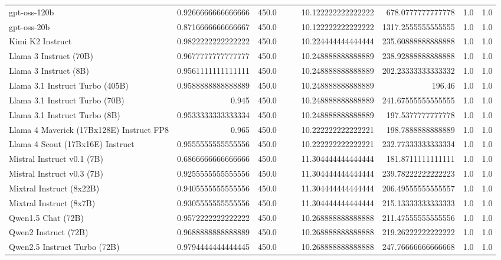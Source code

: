 \begin{table}[htp]
{\begin{tabular}{lrrrrrrrr}
gpt-oss-120b & 0.9266666666666666 & 450.0 &  &  & 10.122222222222222 & 678.0777777777778 & 1.0 & 1.0 \\
gpt-oss-20b & 0.8716666666666667 & 450.0 &  &  & 10.122222222222222 & 1317.2555555555555 & 1.0 & 1.0 \\
Kimi K2 Instruct & 0.9822222222222222 & 450.0 &  &  & 10.224444444444444 & 235.60888888888888 & 1.0 & 1.0 \\
Llama 3 Instruct (70B) & 0.9677777777777777 & 450.0 &  &  & 10.248888888888889 & 238.92888888888888 & 1.0 & 1.0 \\
Llama 3 Instruct (8B) & 0.9561111111111111 & 450.0 &  &  & 10.248888888888889 & 202.23333333333332 & 1.0 & 1.0 \\
Llama 3.1 Instruct Turbo (405B) & 0.9588888888888889 & 450.0 &  &  & 10.248888888888889 & 196.46 & 1.0 & 1.0 \\
Llama 3.1 Instruct Turbo (70B) & 0.945 & 450.0 &  &  & 10.248888888888889 & 241.67555555555555 & 1.0 & 1.0 \\
Llama 3.1 Instruct Turbo (8B) & 0.9533333333333334 & 450.0 &  &  & 10.248888888888889 & 197.5377777777778 & 1.0 & 1.0 \\
Llama 4 Maverick (17Bx128E) Instruct FP8 & 0.965 & 450.0 &  &  & 10.222222222222221 & 198.7888888888889 & 1.0 & 1.0 \\
Llama 4 Scout (17Bx16E) Instruct & 0.9555555555555556 & 450.0 &  &  & 10.222222222222221 & 232.77333333333334 & 1.0 & 1.0 \\
Mistral Instruct v0.1 (7B) & 0.6866666666666666 & 450.0 &  &  & 11.304444444444444 & 181.8711111111111 & 1.0 & 1.0 \\
Mistral Instruct v0.3 (7B) & 0.9255555555555556 & 450.0 &  &  & 11.304444444444444 & 239.78222222222223 & 1.0 & 1.0 \\
Mixtral Instruct (8x22B) & 0.9405555555555556 & 450.0 &  &  & 11.304444444444444 & 206.49555555555557 & 1.0 & 1.0 \\
Mixtral Instruct (8x7B) & 0.9305555555555556 & 450.0 &  &  & 11.304444444444444 & 215.13333333333333 & 1.0 & 1.0 \\
Qwen1.5 Chat (72B) & 0.9572222222222222 & 450.0 &  &  & 10.268888888888888 & 211.47555555555556 & 1.0 & 1.0 \\
Qwen2 Instruct (72B) & 0.9688888888888889 & 450.0 &  &  & 10.268888888888888 & 219.26222222222222 & 1.0 & 1.0 \\
Qwen2.5 Instruct Turbo (72B) & 0.9794444444444445 & 450.0 &  &  & 10.268888888888888 & 247.76666666666668 & 1.0 & 1.0 \\

\end{tabular}}
\end{table}
